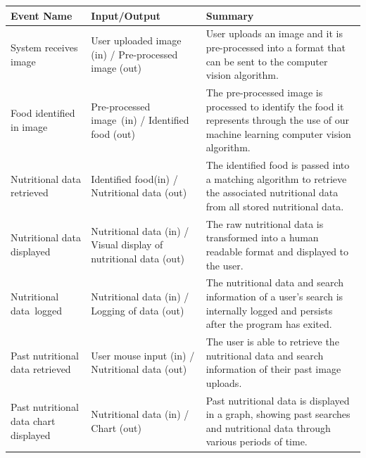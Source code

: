 \documentclass[12pt]{article}
\begin{document}
{\begin{tabular}{ |p{5cm}|p{4cm}|p{6.5cm}| }
\hline
\textbf{Event Name}                   & \textbf{Input/Output}                                            & \textbf{Summary}                                                                                                                            \\ 
\hline
System receives image                 & User uploaded image (in) / Pre-processed image (out)             & User uploads an image and it is pre-processed into a format that can be sent to the computer vision algorithm.                              \\ 
\hline
Food identified in image              & Pre-processed image~(in) / Identified food (out)                 & The pre-processed image is processed to identify the food it represents through the use of our machine learning computer vision algorithm.  \\ 
\hline
Nutritional data retrieved            & Identified food(in) / Nutritional data (out)                     & The identified food is passed into a matching algorithm to retrieve the associated nutritional data from all stored nutritional data.       \\ 
\hline
Nutritional data displayed            & Nutritional data (in) / Visual display of nutritional data (out) & The raw nutritional data is transformed into a human readable format and displayed to the user.                                             \\ 
\hline
Nutritional data~logged               & Nutritional data (in) / Logging of data (out)                    & The nutritional data and search information of a user's search is internally logged and persists after the program has exited.              \\ 
\hline
Past nutritional data retrieved       & User mouse input (in) / Nutritional data (out)                   & The user is able to retrieve the nutritional data and search information of their past image uploads.                                       \\ 
\hline
Past nutritional data chart displayed & Nutritional data (in) / Chart (out)                              & Past nutritional data is displayed in a graph, showing past searches and nutritional data through various periods of time.                  \\
\hline
\end{tabular}

}
\end{document}

